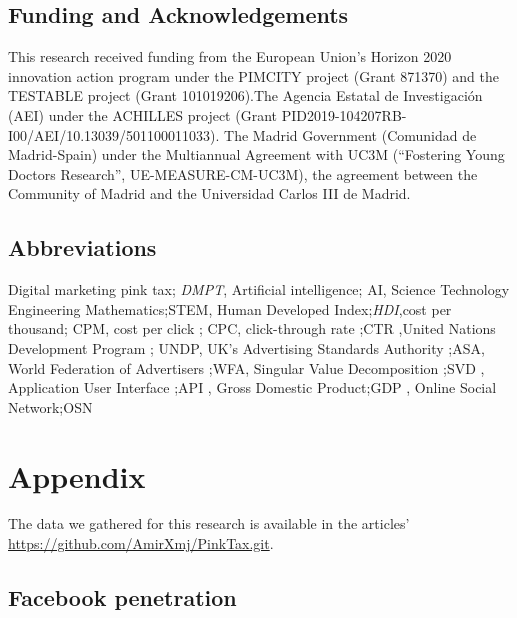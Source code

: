 \documentclass[twocolumn]{bmcart}\usepackage{lineno}
\begin{document}
\begin{backmatter}
\subsection*{Funding and Acknowledgements}
This research received funding from the European Union’s Horizon  2020 innovation action program under the PIMCITY project (Grant 871370) and the TESTABLE project (Grant 101019206).The Agencia Estatal de Investigación (AEI) under the ACHILLES project (Grant PID2019-104207RB-I00/AEI/10.13039/501100011033). The Madrid Government (Comunidad de Madrid-Spain) under the Multiannual Agreement  with UC3M (“Fostering Young Doctors Research”, UE-MEASURE-CM-UC3M), the agreement between the Community of Madrid and 
the Universidad Carlos III de Madrid.

\subsection*{Abbreviations}
Digital marketing pink tax; \emph{DMPT}, Artificial intelligence; AI, Science Technology Engineering Mathematics;STEM, Human Developed Index;\emph{HDI},cost per thousand; CPM, cost per click ; CPC, click-through rate ;CTR ,United Nations Development Program ; UNDP, UK’s Advertising Standards Authority ;ASA, World Federation of Advertisers ;WFA, Singular Value Decomposition ;SVD , Application User Interface ;API , Gross Domestic Product;GDP , Online Social Network;OSN
























\section*{Appendix}

The data we gathered for this research is available in the articles' \url{https://github.com/AmirXmj/PinkTax.git}.



\subsection*{Facebook penetration}


\end{backmatter}
\end{document}
